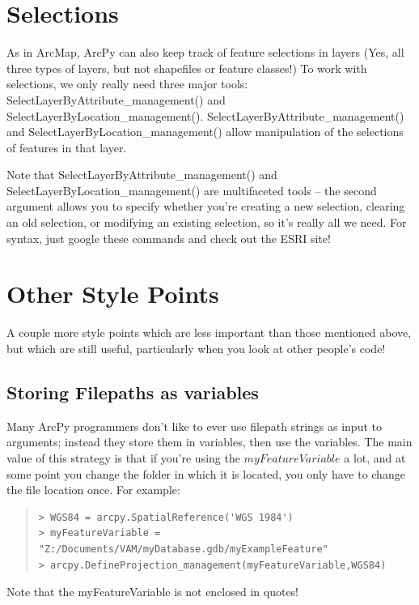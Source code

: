 \documentclass[12pt]{article}
\begin{document}
\section{Selections}
As in ArcMap, ArcPy can also keep track of feature selections in layers (Yes, all three types of layers, but not shapefiles or feature classes!) To work with selections, we only really need three major tools: SelectLayerByAttribute\_management() and SelectLayerByLocation\_management(). SelectLayerByAttribute\_management() and SelectLayerByLocation\_management() allow manipulation of the selections of features in that layer. 

Note that SelectLayerByAttribute\_management() and SelectLayerByLocation\_management() are multifaceted tools -- the second argument allows you to specify whether you're creating a new selection, clearing an old selection, or modifying an existing selection, so it's really all we need. For syntax, just google these commands and check out the ESRI site!



\section{Other Style Points}\label{morestyle}
A couple more style points which are less important than those mentioned above, but which are still useful, particularly when you look at other people's code!

\subsection*{\textbf{Storing Filepaths as variables}}
Many ArcPy programmers don't like to ever use filepath strings as input to arguments; instead they store them in variables, then use the variables. The main value of this strategy is that if you're using the $myFeatureVariable$ a lot, and at some point you change the folder in which it is located, you only have to change the file location once. For example:

\begin{quote}
\begin{verbatim}
> WGS84 = arcpy.SpatialReference('WGS 1984')
> myFeatureVariable = "Z:/Documents/VAM/myDatabase.gdb/myExampleFeature"
> arcpy.DefineProjection_management(myFeatureVariable,WGS84)
\end{verbatim}
\end{quote}
Note that the myFeatureVariable is not enclosed in quotes!
\end{document}
